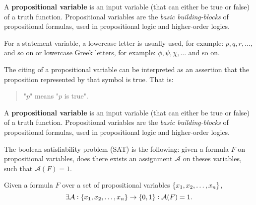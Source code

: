 \iffalse
\section{Introduction to Automated Theorem Proving}
Automated Theorem Proving (ATP) is a critical area within automated reasoning that focuses on the development of computer programs capable of proving mathematical theorems automatically. ATP systems are designed to assist mathematicians, logicians, and computer scientists in validating the correctness of propositions and theorems without human intervention.
\fi
\begin{tcolorbox}[colframe=defcolor,title={\color{white}\bf Propositional Variable}]
\begin{definition}
A \textbf{propositional variable} is an input variable (that can either be true or false) of a truth function. Propositional variables are the \textit{basic building-blocks} of propositional formulas, used in propositional logic and higher-order logics.
\end{definition}
\end{tcolorbox}
\begin{example}
For a statement variable, a lowercase letter is usually used, for example:
$p,q,r,\dots $, and so on
or lowercase Greek letters, for example:
$\phi, \psi, \chi, \dots$ and so on.
\end{example}
\begin{remark}
The citing of a propositional variable can be interpreted as an assertion that the proposition represented by that symbol is true.
That is:
\begin{quote}
"$p$" means "$p$ is true".
\end{quote}
\end{remark}

\begin{tcolorbox}[colframe=defcolor,title={\color{white}\bf Propositional Function (Formula)}]
	\begin{definition}
		A \textbf{propositional variable} is an input variable (that can either be true or false) of a truth function. Propositional variables are the \textit{basic building-blocks} of propositional formulas, used in propositional logic and higher-order logics.
	\end{definition}
\end{tcolorbox}

The boolean satisfiability problem (SAT) is the following: given a formula $F$ on propositional variables, does there exists an assignment $\mathcal{A}$ on theses variables, such that $\mathcal{A}(F)=1$.

Given a formula $F$ over a set of propositional variables $\set{x_1,x_2,\dots,x_n}$, \[
\exists\mathcal{A}:\set{x_1,x_2,\dots,x_n}\to\set{0,1}:\mathcal{A}(F)=1.
\]